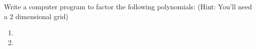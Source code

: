 Write a computer program to factor the following polynomials:\hfil\break
\-\hspace{1cm} (Hint: You'll need a 2 dimensional grid)

\begin{enumerate}[resume]

\item {}

\item {}

\end{enumerate}




\begin{comment}


\begin{maximacode}
grind: true$
\end{maximacode}

\item $\maximac{expand((x^2+x+1)*(x^3+x^2-1));}$




\textcolor{blue}{\maximac{string(eval_string(string(labels[3])));}}

Ans: $\maximac{eval_string(\%);}$

\item $\maximac{expand((x^2+x+1)*(x^3+x^2-1));}$


\maximac{string(eval_string(string(labels[2])));}

\maximac{concat("factor(", eval_string(string(labels[2])), ");");}

$\maximac{eval_string(eval_string(string(labels[2])));}$

\end{comment}
